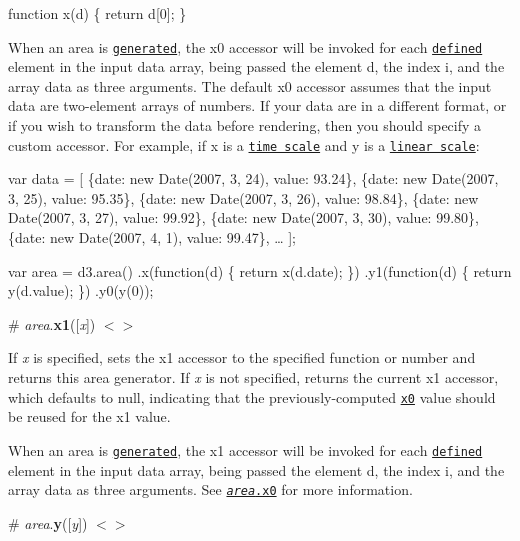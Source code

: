 \begin{DoxyCode}
function x(d) \{
  return d[0];
\}
\end{DoxyCode}


When an area is \href{#_area}{\tt generated}, the x0 accessor will be invoked for each \href{#area_defined}{\tt defined} element in the input data array, being passed the element {\ttfamily d}, the index {\ttfamily i}, and the array {\ttfamily data} as three arguments. The default x0 accessor assumes that the input data are two-\/element arrays of numbers. If your data are in a different format, or if you wish to transform the data before rendering, then you should specify a custom accessor. For example, if {\ttfamily x} is a \href{https://github.com/d3/d3-scale#time-scales}{\tt time scale} and {\ttfamily y} is a \href{https://github.com/d3/d3-scale#linear-scales}{\tt linear scale}\+:


\begin{DoxyCode}
var data = [
  \{date: new Date(2007, 3, 24), value: 93.24\},
  \{date: new Date(2007, 3, 25), value: 95.35\},
  \{date: new Date(2007, 3, 26), value: 98.84\},
  \{date: new Date(2007, 3, 27), value: 99.92\},
  \{date: new Date(2007, 3, 30), value: 99.80\},
  \{date: new Date(2007, 4,  1), value: 99.47\},
  …
];

var area = d3.area()
    .x(function(d) \{ return x(d.date); \})
    .y1(function(d) \{ return y(d.value); \})
    .y0(y(0));
\end{DoxyCode}


\label{_area_x1}%
\# {\itshape area}.{\bfseries x1}(\mbox{[}{\itshape x}\mbox{]}) \href{https://github.com/d3/d3-shape/blob/master/src/area.js#L67}{\tt $<$$>$}

If {\itshape x} is specified, sets the x1 accessor to the specified function or number and returns this area generator. If {\itshape x} is not specified, returns the current x1 accessor, which defaults to null, indicating that the previously-\/computed \href{#area_x0}{\tt x0} value should be reused for the x1 value.

When an area is \href{#_area}{\tt generated}, the x1 accessor will be invoked for each \href{#area_defined}{\tt defined} element in the input data array, being passed the element {\ttfamily d}, the index {\ttfamily i}, and the array {\ttfamily data} as three arguments. See \href{#area_x0}{\tt {\itshape area}.x0} for more information.

\label{_area_y}%
\# {\itshape area}.{\bfseries y}(\mbox{[}{\itshape y}\mbox{]}) \href{https://github.com/d3/d3-shape/blob/master/src/area.js#L71}{\tt $<$$>$}

